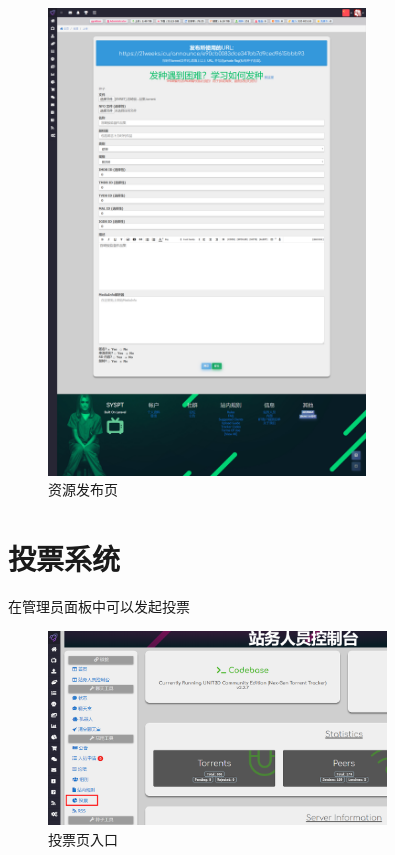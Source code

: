 \begin{figure}[h]
    \centering
    \includegraphics[width=0.75\textwidth]{support-files/5.2-upload-page.png}
    \caption{资源发布页}
    \label{fig:uploadpage}
\end{figure}

\newpage

\section{投票系统}

在管理员面板中可以发起投票

\begin{figure}[h]
    \centering
    \includegraphics[width=0.8\textwidth]{support-files/5.x-poll-dashboard-entrance.png}
    \caption{投票页入口}
    \label{fig:pollentrance}
\end{figure}


